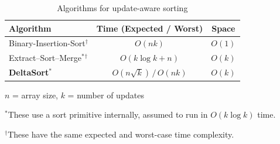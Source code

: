\begin{table}
\centering
\caption{Algorithms for update-aware sorting}
\label{tab:incremental-sorting-algorithms}
\begin{tabular}{l c c}
\toprule
Algorithm & Time (Expected / Worst) & Space \\
\midrule
Binary-Insertion-Sort$^{\dagger}$ & $O(nk)$ & $O(1)$ \\
Extract–Sort–Merge$^{*}$$^{\dagger}$ & $O(k \log k + n)$ & $O(k)$ \\
\textbf{DeltaSort}$^{*}$ & $O(n\sqrt{k})\,/\,O(nk)$ & $O(k)$ \\
\bottomrule
\end{tabular}

\vspace{0.3em}
{$n$ = array size, $k$ = number of updates}

\small $^{*}$These use a sort primitive internally, assumed to run in $O(k \log k)$ time.

\small $^{\dagger}$These have the same expected and worst-case time complexity.
\end{table}